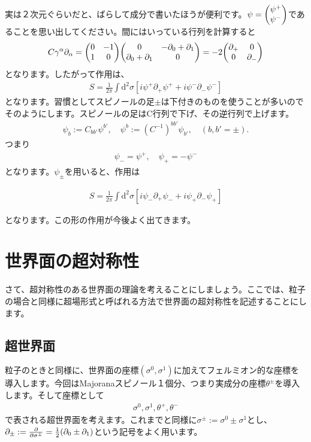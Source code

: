 \documentclass[report,paper=a4, fontsize=12pt, line_length=16cm, number_of_lines=34,dvipdfmx]{jlreq}
\newenvironment{important}{\begin{tcolorbox}[
  colback = white,
  colframe = red!35,
  boxrule = 2mm,
  fonttitle = \bfseries,
  after = \noindent] }{\end{tcolorbox}}
\numberwithin{equation}{chapter}
\numberwithin{equation}{section}
\newcommand{\del}{\partial}
\newcommand{\di}{\mathrm{d}}
\begin{document}
実は２次元ぐらいだと、ばらして成分で書いたほうが便利です。$\psi=\mqty(\psi^{+}\\ \psi^{-})$であることを思い出してください。間にはいっている行列を計算すると
\begin{align}
  C\gamma^{\alpha}\del_{\alpha}
  =\mqty(0 & -1 \\
         1 & 0 )
  \mqty(
    0 & -\del_{0}+\del_{1}\\
    \del_{0}+\del_{1}&0
  )
  =-2\mqty(
    \del_{+} & 0\\
    0 & \del_{-}
  )
\end{align}
となります。したがって作用は、
\begin{align}
  S=\frac{1}{2\pi}\int \di^2\sigma \left[ 
    i\psi^{+}\del_{+}\psi^{+}+i\psi^{-}\del_{-}\psi^{-}
   \right]
\end{align}
となります。習慣としてスピノールの足$\pm$は下付きのものを使うことが多いのでそのようにします。スピノールの足はC行列で下げ、その逆行列で上げます。
\begin{align}
  \psi_{b}:=C_{bb'}\psi^{b'},\quad \psi^{b}:=(C^{-1})^{bb'}\psi_{b'},\quad (b,b'=\pm).
\end{align}
つまり
\begin{align}
  \psi_{-}=\psi^{+},\quad \psi_{+}=-\psi^{-}
\end{align}
となります。$\psi_{\pm}$を用いると、作用は
\begin{important}
  \begin{align}
    S=\frac{1}{2\pi}\int \di^2\sigma \left[ 
      i\psi_{-}\del_{+}\psi_{-}+i\psi_{+}\del_{-}\psi_{+}
     \right]\label{free-fermion-action}
  \end{align}    
\end{important}
となります。この形の作用が今後よく出てきます。

\section{世界面の超対称性}
さて、超対称性のある世界面の理論を考えることにしましょう。ここでは、粒子の場合と同様に超場形式と呼ばれる方法で世界面の超対称性を記述することにします。

\subsection{超世界面}
粒子のときと同様に、世界面の座標$(\sigma^0,\sigma^1)$に加えてフェルミオン的な座標を導入します。今回はMajoranaスピノール１個分、つまり実成分の座標$\theta^{\pm}$を導入します。そして座標として
\begin{align}
  \sigma^{0},\sigma^{1},\theta^{+},\theta^{-}
\end{align}
で表される超世界面を考えます。これまでと同様に$\sigma^{\pm}:=\sigma^0\pm\sigma^1$とし、$\del_{\pm}:=\pdv{\sigma^{\pm}}=\frac{1}{2}(\del_{0}\pm\del_{1})$という記号をよく用います。
\end{document}
